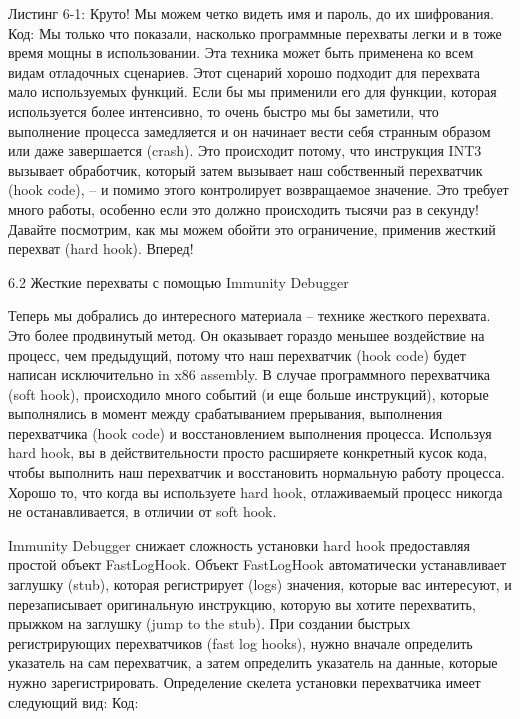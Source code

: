 \documentclass[12pt, a4paper, oneside]{book}
\begin{document}
Листинг 6-1: Круто! Мы можем четко видеть имя и пароль, до их шифрования.
Код:
Мы только что показали, насколько программные перехваты легки и в тоже время мощны в использовании. Эта техника может быть применена ко всем видам отладочных сценариев. Этот сценарий хорошо подходит для перехвата мало используемых функций. Если бы мы применили его для функции, которая используется более интенсивно, то очень быстро мы бы заметили, что выполнение процесса замедляется и он начинает вести себя странным образом или даже завершается (crash). Это происходит потому, что инструкция INT3 вызывает обработчик, который затем вызывает наш собственный перехватчик (hook code), – и помимо этого контролирует возвращаемое значение. Это требует много работы, особенно если это должно происходить тысячи раз в секунду! Давайте посмотрим, как мы можем обойти это ограничение, применив жесткий перехват (hard hook). Вперед!


6.2 Жесткие перехваты с помощью Immunity Debugger

Теперь мы добрались до интересного материала – технике жесткого перехвата. Это более продвинутый метод. Он оказывает гораздо меньшее воздействие на процесс, чем предыдущий, потому что наш перехватчик (hook code) будет написан исключительно in x86 assembly. В случае программного перехватчика (soft hook), происходило много событий (и еще больше инструкций), которые выполнялись в момент между срабатыванием прерывания, выполнения перехватчика (hook code) и восстановлением выполнения процесса. Используя hard hook, вы в действительности просто расширяете конкретный кусок кода, чтобы выполнить наш перехватчик и восстановить нормальную работу процесса. Хорошо то, что когда вы используете hard hook, отлаживаемый процесс никогда не останавливается, в отличии от soft hook.

Immunity Debugger снижает сложность установки hard hook предоставляя простой объект FastLogHook. Объект FastLogHook автоматически устанавливает заглушку (stub), которая регистрирует (logs) значения, которые вас интересуют, и перезаписывает оригинальную инструкцию, которую вы хотите перехватить, прыжком на заглушку (jump to the stub). При создании быстрых регистрирующих перехватчиков (fast log hooks), нужно вначале определить указатель на сам перехватчик, а затем определить указатель на данные, которые нужно зарегистрировать. Определение скелета установки перехватчика имеет следующий вид:
Код:
\end{document}
